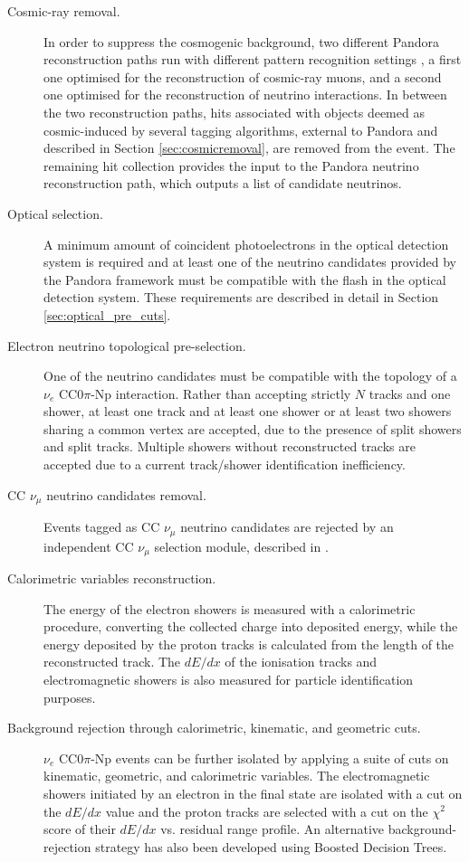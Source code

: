 \begin{description}
\item[Cosmic-ray removal.] In order to suppress the cosmogenic background, two different Pandora reconstruction paths run with different pattern recognition settings \cite{Acciarri:2017hat}, a first one optimised for the reconstruction of cosmic-ray muons, and a second one optimised for the reconstruction of neutrino interactions. In between the two reconstruction paths, hits associated with objects deemed as cosmic-induced by several tagging algorithms, external to Pandora and described in Section \ref{sec:cosmicremoval}, are removed from the event. The remaining hit collection provides the input to the Pandora neutrino reconstruction path, which outputs a list of candidate neutrinos.

\item[Optical selection.] A minimum amount of coincident photoelectrons in the optical detection system is required and at least one of the neutrino candidates provided by the Pandora framework must be compatible with the flash in the optical detection system. These requirements are described in detail in Section \ref{sec:optical_pre_cuts}.

\item[Electron neutrino topological pre-selection.] One of the neutrino candidates must be compatible with the topology of a $\nu_{e}$ CC0$\pi$-Np interaction. Rather than accepting strictly $N$ tracks and one shower, at least one track and at least one shower or at least two showers sharing a common vertex are accepted, due to the presence of split showers and split tracks. Multiple showers without reconstructed tracks are accepted due to a current track/shower identification inefficiency.

\item[CC $\nu_{\mu}$ neutrino candidates removal.] Events tagged as CC $\nu_{\mu}$ neutrino candidates are rejected by an independent CC $\nu_{\mu}$ selection module, described in \cite{ubxsec}. 

\item[Calorimetric variables reconstruction.] The energy of the electron showers is measured with a calorimetric procedure, converting the collected charge into deposited energy, while the energy deposited by the proton tracks is calculated from the length of the reconstructed track. The $dE/dx$ of the ionisation tracks and electromagnetic showers is also measured for particle identification purposes.

\item[Background rejection through calorimetric, kinematic, and geometric cuts.] $\nu_{e}$ CC0$\pi$-Np events can be further isolated by applying a suite of cuts on kinematic, geometric, and calorimetric variables. The electromagnetic showers initiated by an electron in the final state are isolated with a cut on the $dE/dx$ value and the proton tracks are selected with a cut on the $\chi^{2}$ score of their $dE/dx$ vs. residual range profile. An alternative background-rejection strategy has also been developed using Boosted Decision Trees.
\end{description}

